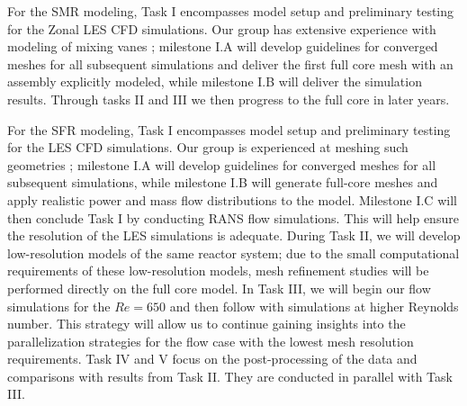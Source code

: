 For the SMR modeling, Task I encompasses model setup and preliminary testing for
the Zonal LES CFD simulations. Our group has extensive experience with modeling of mixing vanes \cite{busco2019invariant}; milestone I.A will develop guidelines for converged meshes for all subsequent simulations and deliver the first full core mesh with an assembly explicitly modeled, while milestone
I.B will deliver the simulation results.  Through tasks II and III we then progress to the full core in later years.

For the SFR modeling, Task I encompasses model setup and preliminary testing for
the LES CFD simulations. Our group is experienced at meshing such geometries \cite{merzari2020toward}; milestone
I.A will develop guidelines for converged meshes for all subsequent simulations, while milestone
I.B will generate full-core meshes and apply realistic power and mass flow distributions to the model.
Milestone I.C will then conclude Task I by conducting RANS flow simulations. This will help ensure the resolution of the LES simulations is adequate.
During Task II, we will develop low-resolution models of the same reactor system;
due to the small computational requirements of these low-resolution models, mesh
refinement studies will be performed directly on the full core model. In Task III, we will begin our flow simulations for the \(Re=650\) and then
follow with simulations at higher Reynolds number. This strategy will allow us to
continue gaining insights into the parallelization strategies for the flow case with the
lowest mesh resolution requirements. Task IV and V focus on the post-processing of the data and comparisons with results from Task II. They are conducted in parallel with Task III.


